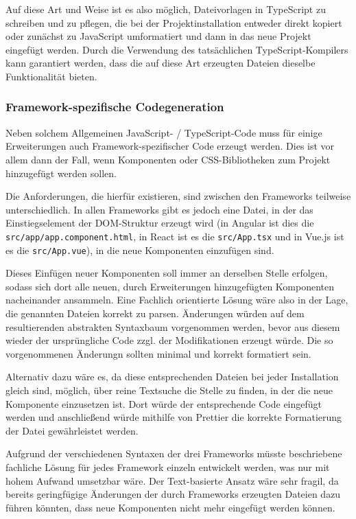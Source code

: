 Auf diese Art und Weise ist es also möglich, Dateivorlagen in TypeScript zu schreiben und zu pflegen, die bei der Projektinstallation entweder direkt kopiert oder zunächst zu JavaScript umformatiert und dann in das neue Projekt eingefügt werden. Durch die Verwendung des tatsächlichen TypeScript-Kompilers kann garantiert werden, dass die auf diese Art erzeugten Dateien dieselbe Funktionalität bieten.

\subsubsection{Framework-spezifische Codegeneration}
Neben solchem Allgemeinen JavaScript- / TypeScript-Code muss für einige Erweiterungen auch Framework-spezifischer Code erzeugt werden. Dies ist vor allem dann der Fall, wenn Komponenten oder CSS-Bibliotheken zum Projekt hinzugefügt werden sollen.

Die Anforderungen, die hierfür existieren, sind zwischen den Frameworks teilweise unterschiedlich. In allen Frameworks gibt es jedoch eine Datei, in der das Einstiegselement der \gls{DOM}-Struktur erzeugt wird (in Angular ist dies die \verb|src/app/app.component.html|, in React ist es die \verb|src/App.tsx| und in Vue.js ist es die \verb|src/App.vue|), in die neue Komponenten einzufügen sind.

Dieses Einfügen neuer Komponenten soll immer an derselben Stelle erfolgen, sodass sich dort alle neuen, durch Erweiterungen hinzugefügten Komponenten nacheinander ansammeln. Eine Fachlich orientierte Lösung wäre also in der Lage, die genannten Dateien korrekt zu parsen. Änderungen würden auf dem resultierenden abstrakten Syntaxbaum vorgenommen werden, bevor aus diesem wieder der ursprüngliche Code zzgl. der Modifikationen erzeugt würde. Die so vorgenommenen Änderungn sollten minimal und korrekt formatiert sein.

Alternativ dazu wäre es, da diese entsprechenden Dateien bei jeder Installation gleich sind, möglich, über reine Textsuche die Stelle zu finden, in der die neue Komponente einzusetzen ist. Dort würde der entsprechende Code eingefügt werden und anschließend würde mithilfe von Prettier die korrekte Formatierung der Datei gewährleistet werden.

Aufgrund der verschiedenen Syntaxen der drei Frameworks müsste beschriebene fachliche Lösung für jedes Framework einzeln entwickelt werden, was nur mit hohem Aufwand umsetzbar wäre. Der Text-basierte Ansatz wäre sehr fragil, da bereits geringfügige Änderungen der durch Frameworks erzeugten Dateien dazu führen könnten, dass neue Komponenten nicht mehr eingefügt werden können.

